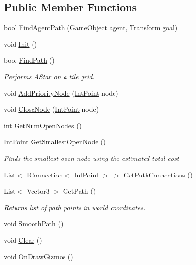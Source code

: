 \subsection*{Public Member Functions}
\begin{DoxyCompactItemize}
\item 
bool \mbox{\hyperlink{class_tile_a_star_a8d7f8af9a007aac6b21553c6d3de0fc6}{Find\+Agent\+Path}} (Game\+Object agent, Transform goal)
\item 
void \mbox{\hyperlink{class_tile_a_star_ae6c2de8ee7160c0d91a28186671717a9}{Init}} ()
\item 
bool \mbox{\hyperlink{class_tile_a_star_a36a0c7fdd0eb1b5189c9e89b2508a714}{Find\+Path}} ()
\begin{DoxyCompactList}\small\item\em Performs A\+Star on a tile grid. \end{DoxyCompactList}\item 
void \mbox{\hyperlink{class_tile_a_star_a287ce910694b2dbf17b03a136557fc26}{Add\+Priority\+Node}} (\mbox{\hyperlink{struct_int_point}{Int\+Point}} node)
\item 
void \mbox{\hyperlink{class_tile_a_star_aff4c93fd2de21b4a7edb156beb76eb2b}{Close\+Node}} (\mbox{\hyperlink{struct_int_point}{Int\+Point}} node)
\item 
int \mbox{\hyperlink{class_tile_a_star_a039b9366e5d285b1c1efe7d3472f80c6}{Get\+Num\+Open\+Nodes}} ()
\item 
\mbox{\hyperlink{struct_int_point}{Int\+Point}} \mbox{\hyperlink{class_tile_a_star_aaf9df73761ac2b7010ec6f85c3cc1b41}{Get\+Smallest\+Open\+Node}} ()
\begin{DoxyCompactList}\small\item\em Finds the smallest open node using the estimated total cost. \end{DoxyCompactList}\item 
List$<$ \mbox{\hyperlink{interface_i_connection}{I\+Connection}}$<$ \mbox{\hyperlink{struct_int_point}{Int\+Point}} $>$ $>$ \mbox{\hyperlink{class_tile_a_star_ab1b21f2b31d816092c4ae9c04d300b96}{Get\+Path\+Connections}} ()
\item 
List$<$ Vector3 $>$ \mbox{\hyperlink{class_tile_a_star_a4566e80f8a54eb58308274acd8d68f7f}{Get\+Path}} ()
\begin{DoxyCompactList}\small\item\em Returns list of path points in world coordinates. \end{DoxyCompactList}\item 
void \mbox{\hyperlink{class_tile_a_star_a2c93e6c430d2b7cc8bde48f8f9b6c1d1}{Smooth\+Path}} ()
\item 
void \mbox{\hyperlink{class_tile_a_star_a5c24481a7825311a5d5b285f3d8368e4}{Clear}} ()
\item 
void \mbox{\hyperlink{class_tile_a_star_af74b5cf47adcbb877850cc5879a94b76}{On\+Draw\+Gizmos}} ()
\end{DoxyCompactItemize}
